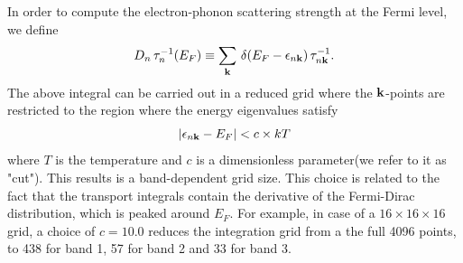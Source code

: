 \documentclass[
amsmath,amssymb,
aps,
prb,
]{revtex4}
\begin{document}
In order to compute the electron-phonon scattering strength at the Fermi level, we define
%
\begin{equation}
D_n\, \tau^{-1}_n(E_F) \equiv \sum_{\bf k}\, \delta(E_F - \epsilon_{n {\bf k}})\, \tau^{-1}_{n {\bf k}}
\label{eqn:tauef}.
\end{equation}
%
The above integral can be carried out in a reduced grid where the ${\bf k}$-points are
restricted to the region where the energy eigenvalues satisfy 
%
\begin{equation}
\left\vert \epsilon_{n {\bf k}} - E_F \right\vert < c \times kT \label{eqn:reduced}
\end{equation}
%
where $T$ is the temperature and $c$ is a dimensionless parameter(we refer to it as "cut"). This results is a band-dependent
grid size. This choice is related to the fact that the transport integrals contain the derivative
of the Fermi-Dirac distribution, which is peaked around $E_F$.
For example, in case of a $16 \times 16 \times 16$ grid, a choice of $c=10.0$ reduces the integration grid from 
a the full 4096 points, to 438 for band 1, 57 for band 2 and 33 for band 3. 
\end{document}
